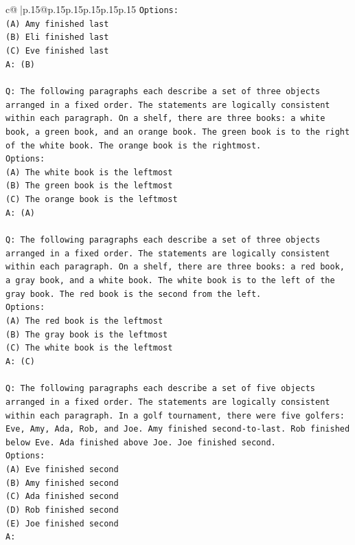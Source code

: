 \documentclass{article}
\begin{document}
{\begin{supertabular}{c@{$\;$}|p{.15\linewidth}@{}p{.15\linewidth}p{.15\linewidth}p{.15\linewidth}p{.15\linewidth}p{.15\linewidth}}
{{{\texttt{Options:} \\
\texttt{(A) Amy finished last} \\
\texttt{(B) Eli finished last} \\
\texttt{(C) Eve finished last} \\
\texttt{A: (B)} \\
\\ 
\texttt{Q: The following paragraphs each describe a set of three objects arranged in a fixed order. The statements are logically consistent within each paragraph. On a shelf, there are three books: a white book, a green book, and an orange book. The green book is to the right of the white book. The orange book is the rightmost.} \\
\texttt{Options:} \\
\texttt{(A) The white book is the leftmost} \\
\texttt{(B) The green book is the leftmost} \\
\texttt{(C) The orange book is the leftmost} \\
\texttt{A: (A)} \\
\\ 
\texttt{Q: The following paragraphs each describe a set of three objects arranged in a fixed order. The statements are logically consistent within each paragraph. On a shelf, there are three books: a red book, a gray book, and a white book. The white book is to the left of the gray book. The red book is the second from the left.} \\
\texttt{Options:} \\
\texttt{(A) The red book is the leftmost} \\
\texttt{(B) The gray book is the leftmost} \\
\texttt{(C) The white book is the leftmost} \\
\texttt{A: (C)} \\
\\ 
\texttt{Q: The following paragraphs each describe a set of five objects arranged in a fixed order. The statements are logically consistent within each paragraph. In a golf tournament, there were five golfers: Eve, Amy, Ada, Rob, and Joe. Amy finished second{-}to{-}last. Rob finished below Eve. Ada finished above Joe. Joe finished second.} \\
\texttt{Options:} \\
\texttt{(A) Eve finished second} \\
\texttt{(B) Amy finished second} \\
\texttt{(C) Ada finished second} \\
\texttt{(D) Rob finished second} \\
\texttt{(E) Joe finished second} \\
\texttt{A:} \\
            }
        }
    }
     \\ \\


\end{supertabular}}
\end{document}
